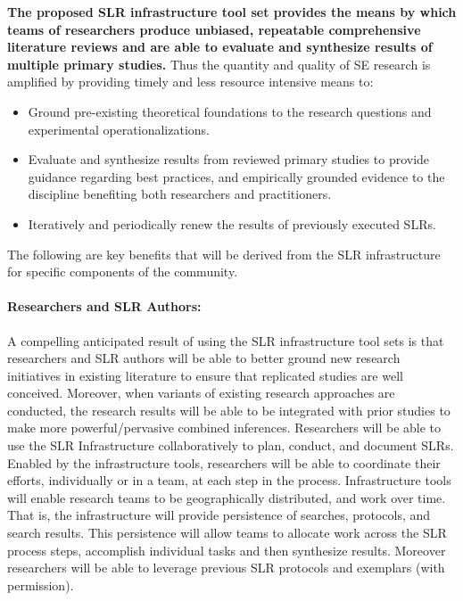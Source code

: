 
\textbf{The proposed SLR infrastructure tool set provides the means by which teams of researchers produce unbiased, repeatable comprehensive literature reviews and are able to evaluate and synthesize results of multiple primary studies.} 
Thus the quantity and quality of SE research is amplified by providing timely and less resource intensive means to:
\vspace{-8pt}
\begin{itemize}
	\item Ground pre-existing theoretical foundations to the research questions and experimental operationalizations.
	\vspace{-4pt}
	\item Evaluate and synthesize results from reviewed primary studies to provide guidance regarding best practices, and empirically grounded evidence to the discipline benefiting both researchers and practitioners.	
	\vspace{-4pt}
	\item Iteratively and periodically renew the results of previously executed SLRs.
\end{itemize}
\vspace{-4pt}
	
The following are key benefits that will be derived from the SLR infrastructure for specific components of the community.

\paragraph{Researchers and SLR Authors:}
A compelling anticipated result of using the SLR infrastructure tool sets is that researchers and SLR authors will be able to better ground new research initiatives in existing literature to ensure that replicated studies are well conceived.  
Moreover, when variants of existing research approaches are conducted, the research results will be able to be integrated with prior studies to make more powerful/pervasive combined inferences.  
Researchers will be able to use the SLR Infrastructure collaboratively to plan, conduct, and document SLRs. 
Enabled by the infrastructure tools, researchers will be able to coordinate their efforts, individually or in a team, at each step in the process.   
Infrastructure tools will enable research teams to be geographically distributed, and work over time.  
That is, the infrastructure will provide persistence of searches, protocols, and search results. 
This persistence will allow teams to allocate work across the SLR process steps, accomplish individual tasks and then synthesize results. 
Moreover researchers will be able to leverage previous SLR protocols and exemplars (with permission).  

